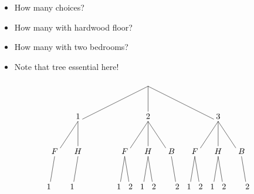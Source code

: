 \documentclass[handout]{beamer}
\theoremstyle{definition}
\begin{document}
\begin{frame}
\begin{itemize}
\item How many choices?
\item How many with hardwood floor?
\only<+->{$5$}
\item How many with two bedrooms?
\item Note that tree essential here!
\end{itemize}
\[\begin{xy}<.5cm,0cm>:
(8.5,0)="0";
(2.5,-3)="1";
(8.5,-3)="2";
(14.5,-3)="3";
"0";"1"*+!D{1}**\dir{-};
"0";"2"*+!D{2}**\dir{-};
"0";"3"*+!D{3}**\dir{-};
(.5,-6)="11";
(2.5,-6)="12";
(4.5,-6)="13";
(6.5,-6)="21";
(8.5,-6)="22";
(10.5,-6)="23";
(12.5,-6)="31";
(14.5,-6)="32";
(16.5,-6)="33";
"1";"11"*+!D{F}**\dir{-};
"1";"12"*+!D{H}**\dir{-};
"2";"21"*+!D{F}**\dir{-};
"2";"22"*+!D{H}**\dir{-};
"2";"23"*+!D{B}**\dir{-};
"3";"31"*+!D{F}**\dir{-};
"3";"32"*+!D{H}**\dir{-};
"3";"33"*+!D{B}**\dir{-};
"11";(0,-9)*+!D{1}**\dir{-};
"12";(2,-9)*+!D{1}**\dir{-};
"21";(6,-9)*+!D{1}**\dir{-};
"21";(7,-9)*+!D{2}**\dir{-};
"22";(8,-9)*+!D{1}**\dir{-};
"22";(9,-9)*+!D{2}**\dir{-};
"23";(11,-9)*+!D{2}**\dir{-};
"31";(12,-9)*+!D{1}**\dir{-};
"31";(13,-9)*+!D{2}**\dir{-};
"32";(14,-9)*+!D{1}**\dir{-};
"32";(15,-9)*+!D{2}**\dir{-};
"33";(17,-9)*+!D{2}**\dir{-};
\end{xy}\]
\end{frame}
\end{document}
